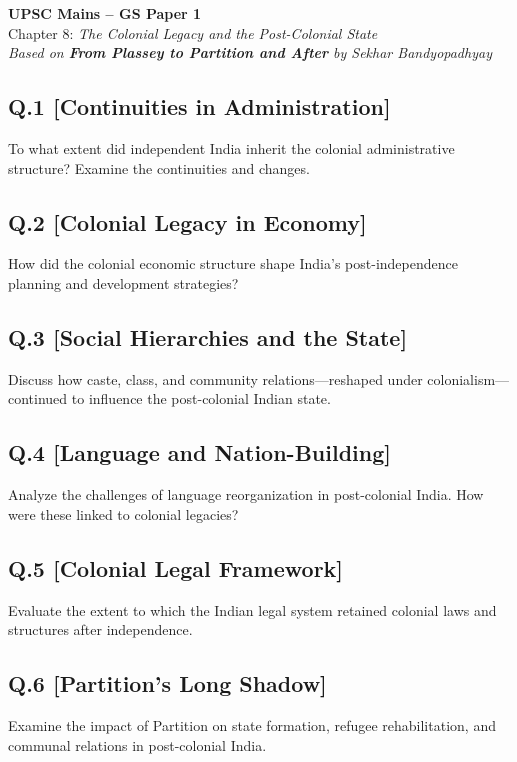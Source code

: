 \begin{center}
    \Large\textbf{UPSC Mains – GS Paper 1}\\
    \normalsize Chapter 8: \textit{The Colonial Legacy and the Post-Colonial State}\\
    \vspace{0.5em}
    \textit{Based on \textbf{From Plassey to Partition and After} by Sekhar Bandyopadhyay}
\end{center}

\vspace{1em}

\subsection*{Q.1 [Continuities in Administration]}
To what extent did independent India inherit the colonial administrative structure? Examine the continuities and changes.

\subsection*{Q.2 [Colonial Legacy in Economy]}
How did the colonial economic structure shape India's post-independence planning and development strategies?

\subsection*{Q.3 [Social Hierarchies and the State]}
Discuss how caste, class, and community relations—reshaped under colonialism—continued to influence the post-colonial Indian state.

\subsection*{Q.4 [Language and Nation-Building]}
Analyze the challenges of language reorganization in post-colonial India. How were these linked to colonial legacies?

\subsection*{Q.5 [Colonial Legal Framework]}
Evaluate the extent to which the Indian legal system retained colonial laws and structures after independence.

\subsection*{Q.6 [Partition's Long Shadow]}
Examine the impact of Partition on state formation, refugee rehabilitation, and communal relations in post-colonial India.

